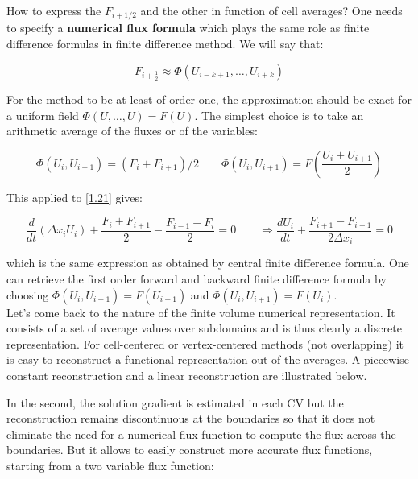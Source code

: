 How to express the $F_{i+1/2}$ and the other in function of cell averages? One needs to specify a \textbf{numerical flux formula} which plays the same role as finite difference formulas in finite difference method. We will say that: 

\begin{equation}
F_{i+\frac{1}{2}} \approx \Phi (U_{i-k+1}, \dots , U_{i+k})
\end{equation}

For the method to be at least of order one, the approximation should be exact for a uniform field $\Phi (U,\dots , U) = F(U)$. The simplest choice is to take an arithmetic average of the fluxes or of the variables: 

\begin{equation}
\Phi (U_i, U_{i+1}) = (F_i + F_{i+1})/2 \qquad \Phi (U_i , U_{i+1}) = F\left(\frac{U_i + U_{i+1}}{2}\right)
\end{equation}

This applied to \autoref{1.21} gives: 

\begin{equation}
\frac{d}{dt}(\Delta x_i U_i) + \frac{F_{i} + F_{i+1}}{2} - \frac{F_{i-1} + F_i}{2} = 0 \qquad \Rightarrow \frac{dU_i}{dt} + \frac{F_{i+1} - F_{i-1}}{2\Delta x_i} = 0
\end{equation}

which is the same expression as obtained by central finite difference formula. One can retrieve the first order forward and backward finite difference formula by choosing $\Phi (U_i,U_{i+1}) = F(U_{i+1})$ and $\Phi (U_i,U_{i+1}) = F(U_i)$. \\

Let's come back to the nature of the finite volume numerical representation. It consists of a set of average values over subdomains and is thus clearly a discrete representation. For cell-centered or vertex-centered methods (not overlapping) it is easy to reconstruct a functional representation out of the averages. A piecewise constant reconstruction and a linear reconstruction are illustrated below. 


In the second, the solution gradient is estimated in each CV but the reconstruction remains discontinuous at the boundaries so that it does not eliminate the need for a numerical flux function to compute the flux across the boundaries. But it allows to easily construct more accurate flux functions, starting from a two variable flux function: 

